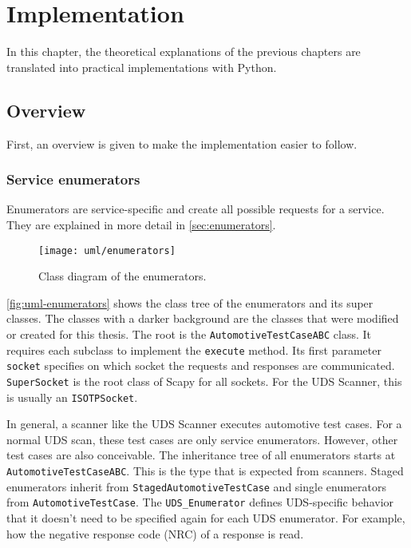 \chapter{Implementation}

In this chapter, the theoretical explanations of the previous chapters are translated into practical implementations with Python.

\section{Overview}

First, an overview is given to make the implementation easier to follow.

\subsection{Service enumerators}

Enumerators are service-specific and create all possible requests for a service. They are explained in more detail in \autoref{sec:enumerators}.

\begin{figure}[htb]
    \centering
    \texttt{[image: uml/enumerators]}
    \caption{Class diagram of the enumerators.}
    \label{fig:uml-enumerators}
\end{figure}

\autoref{fig:uml-enumerators} shows the class tree of the enumerators and its super classes. The classes with a darker background are the classes that were modified or created for this thesis. The root is the \texttt{AutomotiveTestCaseABC} class. It requires each subclass to implement the \texttt{execute} method. Its first parameter \texttt{socket} specifies on which socket the requests and responses are communicated. \texttt{SuperSocket} is the root class of Scapy for all sockets. For the UDS Scanner, this is usually an \texttt{ISOTPSocket}.

In general, a scanner like the UDS Scanner executes automotive test cases. For a normal UDS scan, these test cases are only service enumerators. However, other test cases are also conceivable. The inheritance tree of all enumerators starts at \texttt{AutomotiveTestCaseABC}. This is the type that is expected from scanners.
Staged enumerators inherit from \texttt{StagedAutomotiveTestCase} and single enumerators from \texttt{AutomotiveTestCase}. The \texttt{UDS_Enumerator} defines UDS-specific behavior that it doesn't need to be specified again for each UDS enumerator. For example, how the negative response code (NRC) of a response is read.

